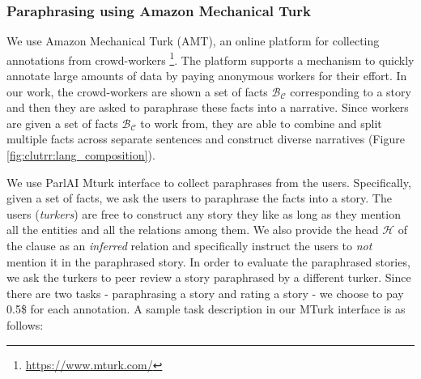 \documentclass[letterpaper, 12pt]{report}
\begin{document}
\subsubsection{Paraphrasing using Amazon Mechanical Turk}

We use Amazon Mechanical Turk (AMT), an online platform for collecting annotations from crowd-workers \footnote{\href{https://www.mturk.com/}{https://www.mturk.com/}}. The platform supports a mechanism to quickly annotate large amounts of data by paying anonymous workers for their effort. In our work, the crowd-workers are shown a set of facts $\mathcal{B}_{\mathcal{C}}$ corresponding to a story and then they are asked to paraphrase these facts into a narrative.
Since workers are given a set of facts $\mathcal{B}_{\mathcal{C}}$ to work from, they are able to combine and split multiple facts across separate sentences and construct diverse narratives (Figure \ref{fig:clutrr:lang_composition}).

We use ParlAI \citep{miller2017parlai} Mturk interface to collect paraphrases from the users. Specifically, given a set of facts, we ask the users to paraphrase the facts into a story. The users (\textit{turkers}) are free to construct any story they like as long as they mention all the entities and all the relations among them. We also provide the head $\mathcal{H}$ of the clause as an \textit{inferred} relation and specifically instruct the users to \textit{not} mention it in the paraphrased story. In order to evaluate the paraphrased stories, we ask the turkers to peer review a story paraphrased by a different turker. Since there are two tasks - paraphrasing a story and rating a story - we choose to pay 0.5\$ for each annotation. A sample task description in our MTurk interface is as follows:
\end{document}
